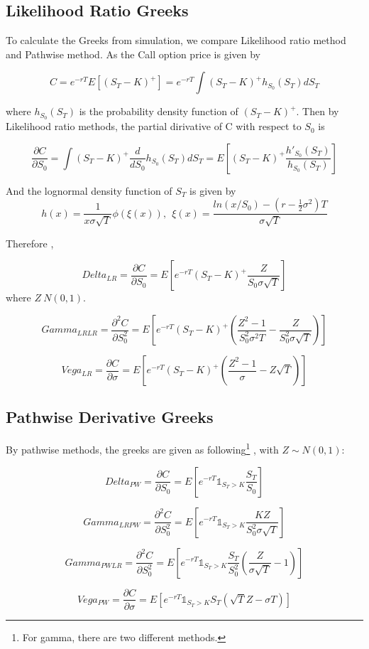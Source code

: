 \documentclass[11pt,a4paper,fleqn,draft]{article}
\begin{document}
\subsection{Likelihood Ratio Greeks}
To calculate the Greeks from simulation, we compare Likelihood ratio method and Pathwise method. As the Call option price is given by

$$C = e^{-rT}E[(S_T-K)^+]=e^{-rT}\int(S_T-K)^+ h_{S_0}(S_T) dS_T$$

where $ h_{S_0}(S_T)$ is the probability density function of $(S_T-K)^+$. Then by Likelihood ratio methods, the partial dirivative of C with respect to $S_0$ is

$$\frac{\partial C}{\partial S_0}=\int(S_T-K)^+\frac{d}{dS_0}h_{S_0}(S_T) dS_T=E[(S_T-K)^+\frac{h'_{S_0}(S_T)}{h_{S_0}(S_T)}] $$

And the lognormal density function of $S_T$ is given by
$$h(x)=\frac{1}{x\sigma \sqrt{T}}\phi(\xi(x)), \ \ \xi(x)=\frac{ln(x/S_0)-(r-\frac{1}{2}\sigma^2)T}{\sigma \sqrt{T}}  $$

Therefore \cite{lectures},

$$Delta_{LR}=\frac{\partial C}{\partial S_0}=E[e^{-rT}(S_T-K)^+\frac{Z}{S_0\sigma\sqrt{T}}]$$
where $Z~N(0,1).$

$$Gamma_{LR LR} = \frac{\partial^2 C}{\partial  S_0^2 }=E[e^{-rT}(S_T-K)^+(\frac{Z^2-1}{S_0^2\sigma^2 T } - \frac{Z}{S_0^2 \sigma \sqrt{T}})]$$

$$Vega_{LR} = \frac{\partial C}{\partial \sigma}=E[e^{-rT}(S_T-K)^+\left(\frac{Z^2-1}{\sigma}-Z\sqrt{T}\right)]$$

\subsection{Pathwise Derivative Greeks}
By pathwise methods, the greeks are given as following\footnote{For gamma, there are two different methods.} \cite{lectures}, with $Z\sim N(0,1)$:

$$Delta_{PW}=\frac{\partial C}{\partial S_0}=E[e^{-rT}\mathds{1}_{S_T>K}\frac{S_T}{S_0}]$$

$$Gamma_{LRPW} = \frac{\partial^2 C}{\partial  S_0^2 }=E[e^{-rT}\mathds{1}_{S_T>K}\frac{KZ}{S_0^2\sigma\sqrt{T}}]$$

$$Gamma_{PWLR} = \frac{\partial^2 C}{\partial  S_0^2 }=E[e^{-rT}\mathds{1}_{S_T>K}\frac{S_T}{S_0^2}\left(\frac{Z}{\sigma\sqrt{T}}-1\right)]$$

$$Vega_{PW} = \frac{\partial C}{\partial \sigma}=E[e^{-rT}\mathds{1}_{S_T>K}S_T(\sqrt{T}Z-\sigma T)]$$
\end{document}
